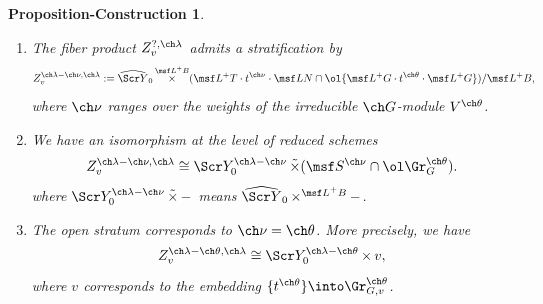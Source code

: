 \documentclass[final]{amsart}
\newtheorem{prop-const}[subsubsection]{Proposition-Construction}
\theoremstyle{remark}
\theoremstyle{definition}
\DeclareMathOperator*{\ttimes}{\tilde\times}
\DeclareMathOperator*{\xt}{\times}
\numberwithin{equation}{section}
\begin{document}
\begin{prop-const} \label{prop:Yact-strat}
\ 
\begin{enumerate}
\item The fiber product $Z_v^{?,\ch\lambda}$ admits a stratification by 
\[
    Z_v^{\ch\lambda-\ch\nu,\ch\lambda} := 
    \widehat{\Scr Y}_0 \xt^{\msf L^+B} 
    (\msf L^+ T \cdot t^{\ch\nu}\cdot \msf L N \cap \ol{ \msf L^+G\cdot t^{\ch\theta} \cdot \msf L^+G}) / \msf L^+B, 
\]
where $\ch\nu$ ranges over the weights of the irreducible $\ch G$-module $V^{\ch\theta}$. 

\item
We have an isomorphism at the level of reduced schemes 
\[ Z_v^{\ch\lambda-\ch\nu,\ch\lambda} \cong 
\Scr Y_0^{\ch\lambda-\ch\nu} \ttimes 
(\msf S^{\ch\nu} \cap \ol\Gr^{\ch\theta}_G). \] 
where $\Scr Y_0^{\ch\lambda-\ch\nu} \ttimes -$ 
means 
$\widehat{\Scr Y}_0
\xt^{\msf L^+B} -$. 

\item
The open stratum corresponds to $\ch\nu=\ch\theta$. More precisely, we have
\[ Z_v^{\ch\lambda-\ch\theta,\ch\lambda} \cong \Scr Y_0^{\ch\lambda-\ch\theta} \xt v, \] 
where $v$ corresponds to the embedding $\{ t^{\ch\theta} \} 
\into \Gr^{\ch\theta}_{G,v}$.
\end{enumerate}
\end{prop-const}
\end{document}
